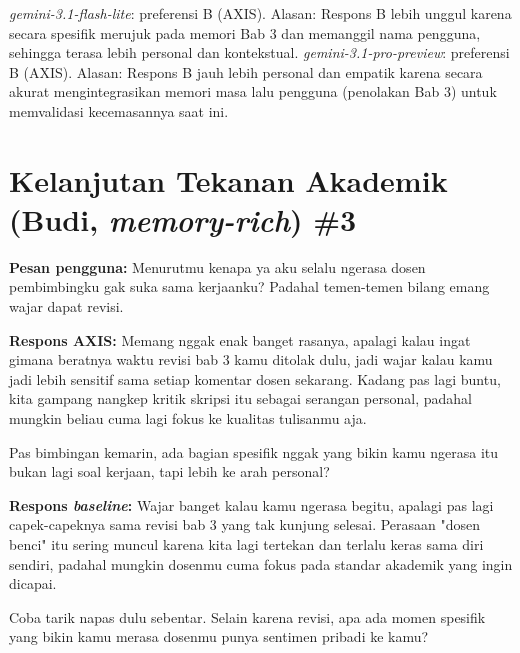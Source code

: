 \textit{gemini-3.1-flash-lite}: preferensi B (AXIS). Alasan: Respons B lebih unggul karena secara spesifik merujuk pada memori Bab 3 dan memanggil nama pengguna, sehingga terasa lebih personal dan kontekstual.\newline
\textit{gemini-3.1-pro-preview}: preferensi B (AXIS). Alasan: Respons B jauh lebih personal dan empatik karena secara akurat mengintegrasikan memori masa lalu pengguna (penolakan Bab 3) untuk memvalidasi kecemasannya saat ini.\newline

\section{Kelanjutan Tekanan Akademik (Budi, \textit{memory-rich}) \#3}

\textbf{Pesan pengguna:} Menurutmu kenapa ya aku selalu ngerasa dosen pembimbingku gak suka sama kerjaanku? Padahal temen-temen bilang emang wajar dapat revisi.

\textbf{Respons AXIS:} Memang nggak enak banget rasanya, apalagi kalau ingat gimana beratnya waktu revisi bab 3 kamu ditolak dulu, jadi wajar kalau kamu jadi lebih sensitif sama setiap komentar dosen sekarang. Kadang pas lagi buntu, kita gampang nangkep kritik skripsi itu sebagai serangan personal, padahal mungkin beliau cuma lagi fokus ke kualitas tulisanmu aja.

Pas bimbingan kemarin, ada bagian spesifik nggak yang bikin kamu ngerasa itu bukan lagi soal kerjaan, tapi lebih ke arah personal?

\textbf{Respons \textit{baseline}:} Wajar banget kalau kamu ngerasa begitu, apalagi pas lagi capek-capeknya sama revisi bab 3 yang tak kunjung selesai. Perasaan "dosen benci" itu sering muncul karena kita lagi tertekan dan terlalu keras sama diri sendiri, padahal mungkin dosenmu cuma fokus pada standar akademik yang ingin dicapai.

Coba tarik napas dulu sebentar. Selain karena revisi, apa ada momen spesifik yang bikin kamu merasa dosenmu punya sentimen pribadi ke kamu?

